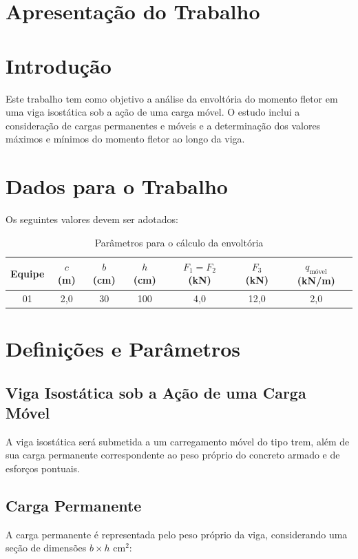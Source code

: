 \section{Apresentação do Trabalho}
\label{sec:apresentacao}


\section{Introdução}
Este trabalho tem como objetivo a análise da envoltória do momento fletor em uma viga isostática sob a ação de uma carga móvel. O estudo inclui a consideração de cargas permanentes e móveis e a determinação dos valores máximos e mínimos do momento fletor ao longo da viga.


\section{Dados para o Trabalho}
Os seguintes valores devem ser adotados:
\begin{table}[h]
    \centering
    \begin{tabular}{|c|c|c|c|c|c|c|}
        \toprule \hline
        \textbf{Equipe} & $c$ (m) & $b$ (cm) & $h$ (cm) & $F_1=F_2$ (kN) & $F_3$ (kN) & $q_{\text{móvel}}$ (kN/m) \\  \hline
        \midrule  \hline
        01              & 2,0     & 30       & 100      & 4,0            & 12,0       & 2,0                       \\  \hline
        \bottomrule
    \end{tabular}
    \caption{Parâmetros para o cálculo da envoltória}
    \label{tab:parametros}
\end{table}


\section{Definições e Parâmetros}

\subsection{Viga Isostática sob a Ação de uma Carga Móvel}
A viga isostática será submetida a um carregamento móvel do tipo trem, além de sua carga permanente correspondente ao peso próprio do concreto armado e de esforços pontuais.

\subsection{Carga Permanente}
A carga permanente é representada pelo peso próprio da viga, considerando uma seção de dimensões $b \times h$ cm$^2$:

